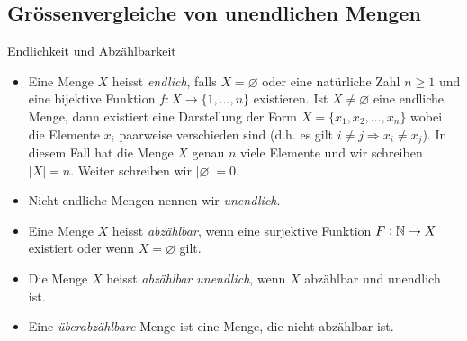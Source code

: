 \subsection{Grössenvergleiche von unendlichen Mengen}



\begin{definition}{Endlichkeit und Abzählbarkeit}
\begin{itemize}
\item Eine Menge $X$ heisst \textit{endlich}, falls $X=\varnothing$ oder eine natürliche Zahl $n\geq 1$ und eine bijektive Funktion $f:X \to \{1,\dots,n\}$ existieren.
Ist $X\neq\varnothing$ eine endliche Menge, dann existiert eine Darstellung der Form $X=\{x_1,x_2,\dots,x_n\}$ wobei die Elemente $x_i$ paarweise verschieden sind (d.h. es gilt $i\neq j\Rightarrow x_i\neq x_j$). In diesem Fall hat die Menge $X$ genau $n$ viele Elemente und wir schreiben $|X|=n$. Weiter schreiben wir $|\varnothing| = 0$.
\item Nicht endliche Mengen nennen wir \textit{unendlich}.
\item Eine Menge $X$ heisst \textit{abzählbar}, wenn eine surjektive Funktion $F:\mathbb{N}\to X$ existiert oder wenn $X=\varnothing$ gilt.
\item Die Menge $X$ heisst \textit{abzählbar unendlich}, wenn $X$ abzählbar und unendlich ist.
\item Eine \textit{überabzählbare} Menge ist eine Menge, die nicht abzählbar ist.
\end{itemize}
\end{definition}
\begin{comment}
\begin{remark}\label{rk:abzMengeAnschauung}
Ähnlich wie im Fall von endlichen Mengen ist jede nichtleere abzählbare Menge $X$ von der Form
\[
X=\{a_0,a_1,a_2,\dots \}=\{a_i\mid i\in\N\}.
\]
Den Zusammenhang zu Definition von Endlichkeit und Abzählbarkeit liefert hier die Funktion $F:\N\to X$, die durch $F(i)=a_i$ gegeben ist.
\end{remark}

\begin{remark}
Abzählbare Mengen kann man sich auch als die Mengen vorstellen, deren Elemente von den natürlichen Zahlen durchnummeriert  (Wiederholungen erlaubt) werden können. Die Elemente einer abzählbaren Menge lassen sich also in eine Liste schreiben, die für jede natürliche Zahl eine Zeile hat.
\begin{center}
\begin{tabular}{c|c}
$\N$ & $X$\\
\hline
$0$ & $x$\\
$1$ & $y$\\
$2$ & $z$\\
$\vdots$ & $\vdots$
\end{tabular}
\end{center}
\end{remark}
\end{comment}

